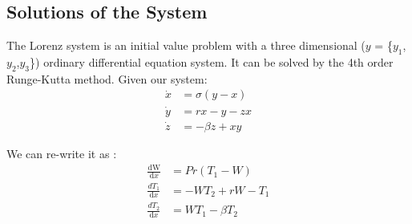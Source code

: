 \documentclass[letterpaper,titlepage,10pt]{article}
\begin{document}
\subsection{Solutions of the System}
{\parindent0pt
The Lorenz system is an initial value problem with a three dimensional ($y$ = \{$y_{1}$,$y_{2}$,$y_{3}$\}) ordinary differential equation system. It can be solved by the 4th order Runge-Kutta method.\cite{a}
Given our system:
\begin{align*}
\dot{x} &= \sigma(y-x) \\
\dot{y} &= rx -y - zx  \\
\dot{z} &= -\beta z + xy 
\end{align*}

We can re-write it as \cite{f}:
\begin{align*}
\frac{\text{dW}}{\text{d}x} &= Pr(T_{1}-W) \\
\frac{dT_{1}}{\text{d}x} &= -WT_{2} + rW - T_{1} \\
\frac{dT_{2}}{\text{d}x} &= WT_{1} - \beta T_{2}
\end{align*}

}
\end{document}
